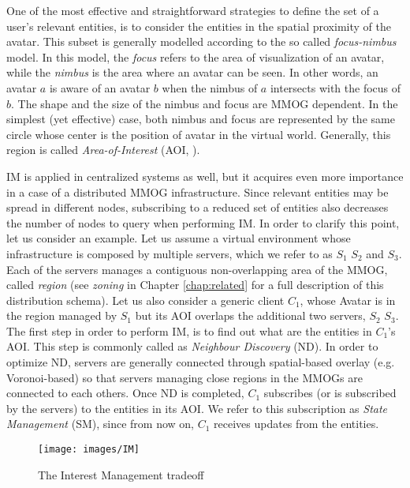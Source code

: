 \documentclass[final,10pt,a5paper]{phdimt}
\theoremstyle{definition}
\begin{document}
One of the most effective and straightforward strategies to define the set of a user's relevant entities, is to consider the entities in the spatial proximity of the avatar.
This subset is generally modelled according to the so called \textit{focus-nimbus} model.
In this model, the \textit{focus} refers to the area of visualization of an avatar, while the \textit{nimbus} is the area where an avatar can be seen.
In other words, an avatar $a$ is aware of an avatar $b$ when the nimbus of $a$ intersects with the focus of $b$. 
The shape and the size of the nimbus and focus are MMOG dependent.
In the simplest (yet effective) case, both nimbus and focus are represented by the same circle whose center is the position of avatar in the virtual world.
Generally, this region is called \textit{Area-of-Interest} (AOI, \cite{el2006aoim}).



IM is applied in centralized systems as well, but it acquires even more importance in a case of a distributed MMOG infrastructure. 
Since relevant entities may be spread in different nodes, subscribing to a reduced set of entities also decreases the number of nodes to query when performing IM.
In order to clarify this point, let us consider an example.
Let us assume a virtual environment whose infrastructure is composed by multiple servers, which we refer to as $S_1$ $S_2$ and $S_3$.
Each of the servers manages a contiguous non-overlapping area of the MMOG, called \textit{region}  (see \textit{zoning} in Chapter \ref{chap:related} for a full description of this distribution schema).
Let us also consider a generic client $C_1$, whose Avatar is in the region managed by $S_1$ but its AOI overlaps the additional two servers, $S_2$ $S_3$. 
The first step in order to perform IM, is to find out what are the entities in $C_1$'s AOI.
This step is commonly called as \textit{Neighbour Discovery} (ND).
In order to optimize ND, servers are generally connected through spatial-based overlay (e.g. Voronoi-based) so that servers managing close regions in the MMOGs are connected to each others. 
Once ND is completed, $C_1$ subscribes  (or is subscribed by the servers) to the entities in its AOI.
We refer to this subscription as \textit{State Management} (SM), since from now on, $C_1$ receives updates from the entities.


\begin{figure}[tbh]
\centering
\texttt{[image: images/IM]}
\caption{The Interest Management tradeoff}\label{fig:im-tradeoff}
\end{figure}
\end{document}
